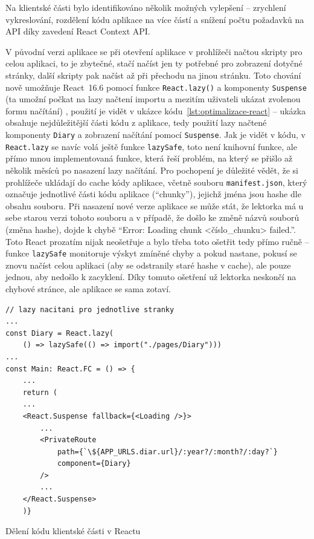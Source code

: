 Na klientské části bylo identifikováno několik možných vylepšení -- zrychlení vykreslování, rozdělení kódu aplikace na více částí a snížení počtu požadavků na API díky zavedení React Context API.

V původní verzi aplikace se při otevření aplikace v prohlížeči načtou skripty pro celou aplikaci, to je zbytečné, stačí načíst jen ty potřebné pro zobrazení dotyčné stránky, další skripty pak načíst až při přechodu na jinou stránku. Toto chování nově umožňuje React~16.6 pomocí funkce \verb|React.lazy()| a komponenty \verb|Suspense| (ta umožní počkat na lazy načtení importu a mezitím uživateli ukázat zvolenou formu načítání) \cite{react-blog-166}, použití je vidět v ukázce kódu~\ref{lst:optimalizace-react} -- ukázka obsahuje nejdůležitější části kódu z aplikace, tedy použití lazy načtené komponenty \verb|Diary| a zobrazení načítání pomocí \verb|Suspense|. Jak je vidět v kódu, v \verb|React.lazy| se navíc volá ještě funkce \verb|lazySafe|, toto není knihovní funkce, ale přímo mnou implementovaná funkce, která řeší problém, na který se přišlo až několik měsíců po nasazení lazy načítání. Pro pochopení je důležité vědět, že si prohlížeče ukládají do cache kódy aplikace, včetně souboru \verb|manifest.json|, který označuje jednotlivé části kódu aplikace (\enquote{chunky}), jejichž jména jsou hashe dle obsahu souboru. Při nasazení nové verze aplikace se může stát, že lektorka má u sebe starou verzi tohoto souboru a v případě, že došlo ke změně názvů souborů (změna hashe), dojde k chybě \enquote{Error: Loading chunk <číslo\_chunku> failed.}. Toto React prozatím nijak neošetřuje a bylo třeba toto ošetřit tedy přímo ručně -- funkce \verb|lazySafe| monitoruje výskyt zmíněné chyby a pokud nastane, pokusí se znovu načíst celou aplikaci (aby se odstranily staré hashe v cache), ale pouze jednou, aby nedošlo k zacyklení. Díky tomuto ošetření už lektorka neskončí na chybové stránce, ale aplikace se sama zotaví.

\begin{listing}[ht]
	\begin{verbatim}
// lazy nacitani pro jednotlive stranky
...
const Diary = React.lazy(
    () => lazySafe(() => import("./pages/Diary")))
...
const Main: React.FC = () => {
    ...
    return (
    ...
    <React.Suspense fallback={<Loading />}>
        ...
        <PrivateRoute
            path={`\${APP_URLS.diar.url}/:year?/:month?/:day?`}
            component={Diary}
        />
        ...
    </React.Suspense>
    )}
	\end{verbatim}
	\caption{Dělení kódu klientské části v Reactu}\label{lst:optimalizace-react}
\end{listing}

